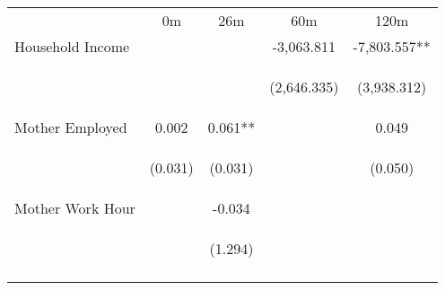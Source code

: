 \begin{tabular}{lcccc}
\hline \noalign{\smallskip} & 0m & 26m & 60m & 120m\\
\noalign{\smallskip}\hline \noalign{\smallskip}Household Income &  &  & -3,063.811 & -7,803.557**\\
 & \begin{footnotesize}\end{footnotesize} & \begin{footnotesize}\end{footnotesize} & \begin{footnotesize}(2,646.335)\end{footnotesize} & \begin{footnotesize}(3,938.312)\end{footnotesize}\\
\noalign{\smallskip}Mother Employed & 0.002 & 0.061** &  & 0.049\\
 & \begin{footnotesize}(0.031)\end{footnotesize} & \begin{footnotesize}(0.031)\end{footnotesize} & \begin{footnotesize}\end{footnotesize} & \begin{footnotesize}(0.050)\end{footnotesize}\\
\noalign{\smallskip}Mother Work Hour &  & -0.034 &  & \\
 & \begin{footnotesize}\end{footnotesize} & \begin{footnotesize}(1.294)\end{footnotesize} & \begin{footnotesize}\end{footnotesize} & \begin{footnotesize}\end{footnotesize}\\
\noalign{\smallskip}\hline\end{tabular}\\
